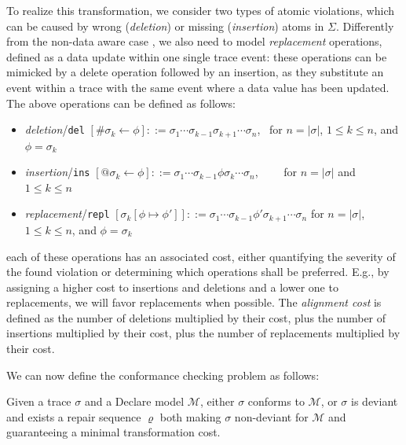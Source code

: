 To realize this transformation, we consider two types of atomic violations, which can be caused by wrong (\textit{deletion}) or missing (\textit{insertion}) atoms in $\Sigma$. Differently from the non-data aware case \cite{Moje}, we also need to model \textit{replacement} operations, defined as a data update within one single trace event: these operations can be mimicked by a delete operation followed by an insertion, as they substitute an event within a trace with the same event where a data value has been updated. The above operations can be defined as follows:
\begin{itemize}
	\item \textit{deletion}/\texttt{del} $[\#\sigma_k\leftarrow \phi]::= \sigma_1\cdots\sigma_{k-1}\sigma_{k+1}\cdots \sigma_n$,\,\,\, for $n=|\sigma|$, $1\leq k\leq n$, and $\phi=\sigma_k$
	\item \textit{insertion}/\texttt{ins} $[@\sigma_k\leftarrow \phi]::= \sigma_1\cdots\sigma_{k-1}\phi\sigma_{k}\cdots \sigma_n$,\,\,\,\,\,\,\,\,\,\,\,\, for $n=|\sigma|$ and $1\leq k\leq n$
	\item \textit{replacement}/\texttt{repl} $[\sigma_k[\phi\mapsto\phi']]::=\sigma_1\cdots \sigma_{k-1}\phi'\sigma_{k+1}\cdots\sigma_n$ for $n=|\sigma|$, $1\leq k\leq n$, and $\phi=\sigma_k$
\end{itemize}
 each of these operations has an associated cost, either quantifying the severity of the found violation or determining which operations shall be preferred. E.g., by assigning a higher cost to insertions and deletions and a lower one to replacements, we will favor replacements when possible. The \textit{alignment cost} is defined as the number of deletions multiplied by their cost, plus the number of insertions multiplied by their cost, plus the number of replacements multiplied by their cost.

We can now define the conformance checking problem as follows:
\begin{definition}
Given a trace $\sigma$ and a Declare model $\mathcal{M}$, either $\sigma$ conforms to $\mathcal{M}$, or $\sigma$ is deviant and  exists a repair sequence $\varrho$ both making $\sigma$ non-deviant for $\mathcal{M}$ and guaranteeing a minimal transformation cost.
\end{definition}

